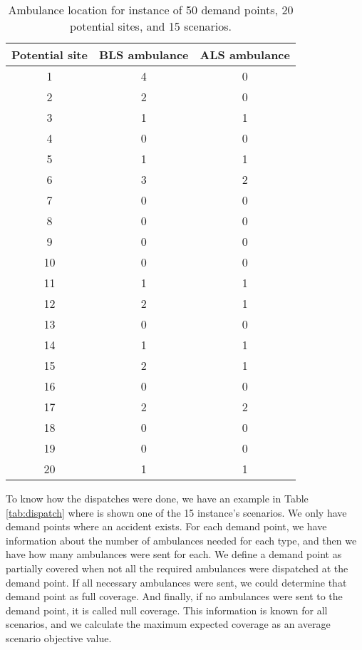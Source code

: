 \begin{table}[]
\centering 
\small\addtolength{\tabcolsep}{-5pt}
\begin{tabular}{|c|c|c|}
\hline
\rowcolor[HTML]{FFCCC9} 
Potential site & BLS ambulance & ALS ambulance \\ \hline
1              & 4             & 0             \\ \hline
2              & 2             & 0             \\ \hline
3              & 1             & 1             \\ \hline
4              & 0             & 0             \\ \hline
5              & 1             & 1             \\ \hline
6              & 3             & 2             \\ \hline
7              & 0             & 0             \\ \hline
8              & 0             & 0             \\ \hline
9              & 0             & 0             \\ \hline
10             & 0             & 0             \\ \hline
11             & 1             & 1             \\ \hline
12             & 2             & 1             \\ \hline
13             & 0             & 0             \\ \hline
14             & 1             & 1             \\ \hline
15             & 2             & 1             \\ \hline
16             & 0             & 0             \\ \hline
17             & 2             & 2             \\ \hline
18             & 0             & 0             \\ \hline
19             & 0             & 0             \\ \hline
20             & 1             & 1             \\ \hline
\end{tabular}
\caption{Ambulance location for instance of 50 demand points, 20 potential sites, and 15 scenarios.}	\label{tab:location}
\end{table}

To know how the dispatches were done, we have an example in Table \ref{tab:dispatch} where is shown one of the 15 instance's scenarios. We only have demand points where an accident exists. For each demand point, we have information about the number of ambulances needed for each type, and then we have how many ambulances were sent for each. We define a demand point as partially covered when not all the required ambulances were dispatched at the demand point. If all necessary ambulances were sent, we could determine that demand point as full coverage. And finally, if no ambulances were sent to the demand point, it is called null coverage. This information is known for all scenarios, and we calculate the maximum expected coverage as an average scenario objective value. 


